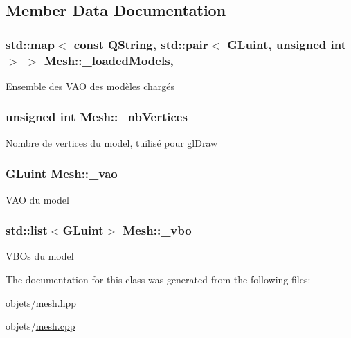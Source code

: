 \subsection{Member Data Documentation}
\hypertarget{class_mesh_aa97db2c6844e7517a8f8343fb5e3259e}{
\subsubsection[{\+\_\+loaded\+Models}]{\setlength{\rightskip}{0pt plus 5cm}std\+::map$<$ const Q\+String, std\+::pair$<$ G\+Luint, unsigned int $>$ $>$ Mesh\+::\+\_\+loaded\+Models\hspace{0.3cm}{\ttfamily [static]}, {\ttfamily [private]}}}\label{class_mesh_aa97db2c6844e7517a8f8343fb5e3259e}
Ensemble des V\+A\+O des modèles chargés \hypertarget{class_mesh_a6ba32034874ae52e5f69b13086ffbcf4}{
\subsubsection[{\+\_\+nb\+Vertices}]{\setlength{\rightskip}{0pt plus 5cm}unsigned int Mesh\+::\+\_\+nb\+Vertices\hspace{0.3cm}{\ttfamily [private]}}}\label{class_mesh_a6ba32034874ae52e5f69b13086ffbcf4}
Nombre de vertices du model, tuilisé pour gl\+Draw \hypertarget{class_mesh_a1949164d110452d2d7a44f5ccac34194}{
\subsubsection[{\+\_\+vao}]{\setlength{\rightskip}{0pt plus 5cm}G\+Luint Mesh\+::\+\_\+vao\hspace{0.3cm}{\ttfamily [private]}}}\label{class_mesh_a1949164d110452d2d7a44f5ccac34194}
V\+A\+O du model \hypertarget{class_mesh_ad14f28c038a34b836a9ff7a9d601d281}{
\subsubsection[{\+\_\+vbo}]{\setlength{\rightskip}{0pt plus 5cm}std\+::list$<$G\+Luint$>$ Mesh\+::\+\_\+vbo\hspace{0.3cm}{\ttfamily [private]}}}\label{class_mesh_ad14f28c038a34b836a9ff7a9d601d281}
V\+B\+Os du model 

The documentation for this class was generated from the following files\+:\begin{DoxyCompactItemize}
\item 
objets/\hyperlink{mesh_8hpp}{mesh.\+hpp}\item 
objets/\hyperlink{mesh_8cpp}{mesh.\+cpp}\end{DoxyCompactItemize}
